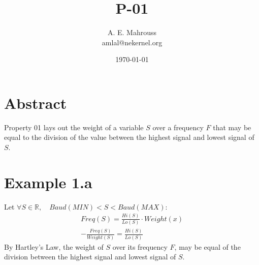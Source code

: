 \documentclass{article}
\title{P-01}
\author{A. E. Mahrouss\\amlal@nekernel.org}
\date{\today}
\begin{document}
\maketitle

\section{Abstract}
Property 01 lays out the weight of a variable $S$ over a frequency $F$ that may be equal to the division of the value between the highest signal and lowest signal of $S$.

\section{Example 1.a}
Let
$\forall S \in \mathbb{R}, \quad Baud(MIN) < S < Baud(MAX)$:
\begin{align*}
Freq(S) = \frac{Hi(S)}{Lo(S)} \cdot Weight(x)\\
-\frac{Freq(S)}{Weight(S)} = \frac{Hi(S)}{Lo(S)}
\end{align*}
By Hartley's Law, the weight of $S$ over its frequency $F$, may be equal of the division between the highest signal and lowest signal of $S$.

\nocite{*}



\end{document}
